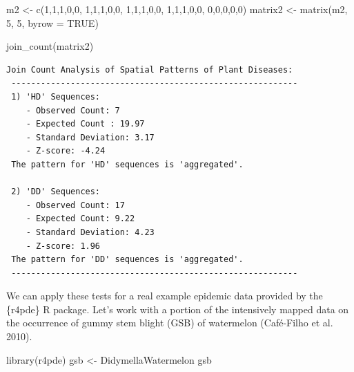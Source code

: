 \documentclass[
  letterpaper,
]{book}
\newenvironment{Shaded}{\begin{snugshade}}{\end{snugshade}}
\newcommand{\AttributeTok}[1]{\textcolor[rgb]{0.40,0.45,0.13}{#1}}
\newcommand{\ConstantTok}[1]{\textcolor[rgb]{0.56,0.35,0.01}{#1}}
\newcommand{\DecValTok}[1]{\textcolor[rgb]{0.68,0.00,0.00}{#1}}
\newcommand{\FunctionTok}[1]{\textcolor[rgb]{0.28,0.35,0.67}{#1}}
\newcommand{\NormalTok}[1]{\textcolor[rgb]{0.00,0.23,0.31}{#1}}
\newcommand{\OtherTok}[1]{\textcolor[rgb]{0.00,0.23,0.31}{#1}}
\begin{document}
\begin{Shaded}
\begin{Highlighting}[]
\NormalTok{m2 }\OtherTok{\textless{}{-}} \FunctionTok{c}\NormalTok{(}\DecValTok{1}\NormalTok{,}\DecValTok{1}\NormalTok{,}\DecValTok{1}\NormalTok{,}\DecValTok{0}\NormalTok{,}\DecValTok{0}\NormalTok{,}
       \DecValTok{1}\NormalTok{,}\DecValTok{1}\NormalTok{,}\DecValTok{1}\NormalTok{,}\DecValTok{0}\NormalTok{,}\DecValTok{0}\NormalTok{,}
       \DecValTok{1}\NormalTok{,}\DecValTok{1}\NormalTok{,}\DecValTok{1}\NormalTok{,}\DecValTok{0}\NormalTok{,}\DecValTok{0}\NormalTok{,}
       \DecValTok{1}\NormalTok{,}\DecValTok{1}\NormalTok{,}\DecValTok{1}\NormalTok{,}\DecValTok{0}\NormalTok{,}\DecValTok{0}\NormalTok{,}
       \DecValTok{0}\NormalTok{,}\DecValTok{0}\NormalTok{,}\DecValTok{0}\NormalTok{,}\DecValTok{0}\NormalTok{,}\DecValTok{0}\NormalTok{)}
\NormalTok{matrix2 }\OtherTok{\textless{}{-}} \FunctionTok{matrix}\NormalTok{(m2, }\DecValTok{5}\NormalTok{, }\DecValTok{5}\NormalTok{, }\AttributeTok{byrow =} \ConstantTok{TRUE}\NormalTok{)}

\FunctionTok{join\_count}\NormalTok{(matrix2)}
\end{Highlighting}
\end{Shaded}

\begin{verbatim}
Join Count Analysis of Spatial Patterns of Plant Diseases:
 ----------------------------------------------------------
 1) 'HD' Sequences:
    - Observed Count: 7
    - Expected Count : 19.97
    - Standard Deviation: 3.17
    - Z-score: -4.24
 The pattern for 'HD' sequences is 'aggregated'.

 2) 'DD' Sequences:
    - Observed Count: 17
    - Expected Count: 9.22
    - Standard Deviation: 4.23
    - Z-score: 1.96
 The pattern for 'DD' sequences is 'aggregated'.
 ----------------------------------------------------------
\end{verbatim}

We can apply these tests for a real example epidemic data provided by
the \{r4pde\} R package. Let's work with a portion of the intensively
mapped data on the occurrence of gummy stem blight (GSB) of watermelon
(Café-Filho et al. 2010).

\begin{Shaded}
\begin{Highlighting}[]
\FunctionTok{library}\NormalTok{(r4pde)}
\NormalTok{gsb }\OtherTok{\textless{}{-}}\NormalTok{ DidymellaWatermelon}
\NormalTok{gsb }
\end{Highlighting}
\end{Shaded}
\end{document}
